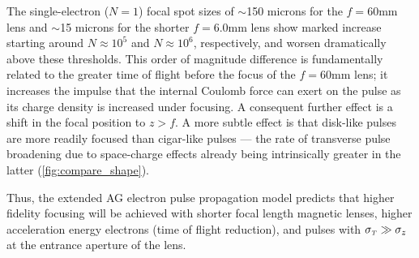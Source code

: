 The single-electron ($ N = 1 $) focal spot sizes of $\sim$150 microns for the $ f = 60 \text{mm} $ lens and $\sim$15 microns for the shorter $ f = 6.0 \text{mm} $ lens show marked increase starting around $ N \approx 10^{ 5 } $ and $ N \approx 10^{ 6 }$, respectively, and worsen dramatically above these thresholds.
This order of magnitude difference is fundamentally related to the greater time of flight before the focus of the $ f = 60\text{mm} $ lens; it increases the impulse that the internal Coulomb force can exert on the pulse as its charge density is increased under focusing.
A consequent further effect is a shift in the focal position to $ z > f $.
A more subtle effect is that disk-like pulses are more readily focused than cigar-like pulses --- the rate of transverse pulse broadening due to space-charge effects already being intrinsically greater in the latter (\ref{fig:compare_shape}).


Thus, the extended AG electron pulse propagation model predicts that higher fidelity focusing will be achieved with shorter focal length magnetic lenses, higher acceleration energy electrons (time of flight reduction), and pulses with $ \sigma_{ {\scriptscriptstyle T} } \gg \sigma_{ z } $ at the entrance aperture of the lens.

